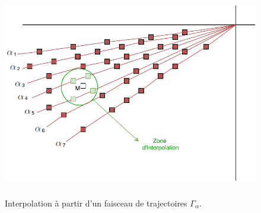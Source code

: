 {\begin{figure}[H]
	\centerline{
		\includegraphics[height=9cm]{images_these/Interpolation.pdf}}
	\caption[Interpolation à partir d'un faisceau de trajectoires. ]{Interpolation à partir d'un faisceau de trajectoires $\Gamma_{\alpha}$.}
	\label{Interpolation}
\end{figure}
}
